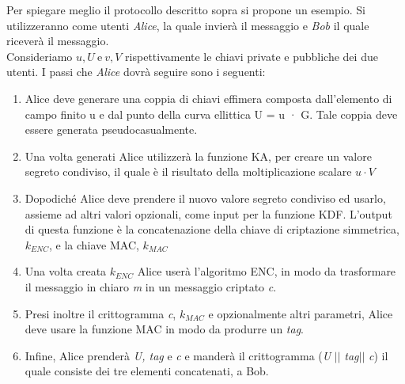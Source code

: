 \documentclass[12pt, a4paper]{report}
\begin{document}
Per spiegare meglio il protocollo descritto sopra si propone un esempio. Si utilizzeranno come utenti \textit{Alice}, la quale invierà il messaggio e \textit{Bob} il quale riceverà il messaggio.
\\Consideriamo $u, U\ \text{e} \ v, V$ rispettivamente le chiavi private e pubbliche dei due utenti.
I passi che \textit{Alice} dovrà seguire sono i seguenti:
\begin{enumerate}
    \item Alice deve generare una coppia di chiavi effimera composta dall'elemento di campo finito u e dal punto della curva ellittica U = u · G. Tale coppia deve essere generata pseudocasualmente.
    \item Una volta generati Alice utilizzerà la funzione KA, per creare un valore segreto condiviso, il quale è il risultato della moltiplicazione scalare $u \cdot V$
    \item Dopodiché Alice deve prendere il nuovo valore segreto condiviso ed usarlo, assieme ad altri valori opzionali, come input per la funzione KDF. L'output di questa funzione è la concatenazione della chiave di criptazione simmetrica, $k_{ENC}$, e la chiave MAC, $k_{MAC}$
    \item Una volta creata $k_{ENC}$ Alice userà l'algoritmo ENC, in modo da trasformare il messaggio in chiaro \textit{m} in un messaggio criptato \textit{c}.
    \item Presi inoltre il crittogramma \textit{c}, $k_{MAC}$ e opzionalmente altri parametri, Alice deve usare la funzione MAC in modo da produrre un \textit{tag}.
    \item Infine, Alice prenderà \textit{U, tag} e \textit{c} e manderà il crittogramma (\textit{U} $\vert\vert$ \textit{tag}$\vert\vert$ \textit{c}) il quale consiste dei tre elementi concatenati, a Bob.
\end{enumerate}
\cite{Gayoso}
\end{document}
